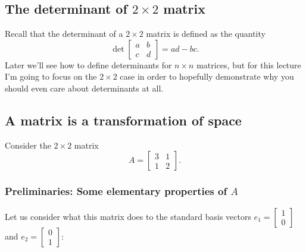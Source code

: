 \documentclass[10pt]{article}
\theoremstyle{definition}
\begin{document}
\subsection{The determinant of  \texorpdfstring{$2\times 2$}{2} matrix}

Recall that the determinant of a $2\times 2$ matrix is
defined as the quantity
\begin{equation*}
  \det \begin{bmatrix}
    a&b\\
    c&d
  \end{bmatrix} = ad-bc.
\end{equation*}
Later we'll see how to define determinants for $n\times n$ matrices, but for
this lecture I'm going to focus on the $2\times 2$ case in order to hopefully
demonstrate why you should even care about determinants at all.

\subsection{A matrix is a transformation of space}

Consider the $2\times 2$ matrix
\begin{equation*}
  A=\begin{bmatrix}
    3&1\\
    1&2
  \end{bmatrix}.
\end{equation*}

\subsubsection*{Preliminaries: Some elementary properties of \texorpdfstring{$A$}{A} }
Let us consider what this matrix does to the standard basis vectors $e_{1}=
\begin{bmatrix}
  1\\0
\end{bmatrix}
$
and $e_{2}=
\begin{bmatrix}
  0\\1
\end{bmatrix}
$:
\end{document}
